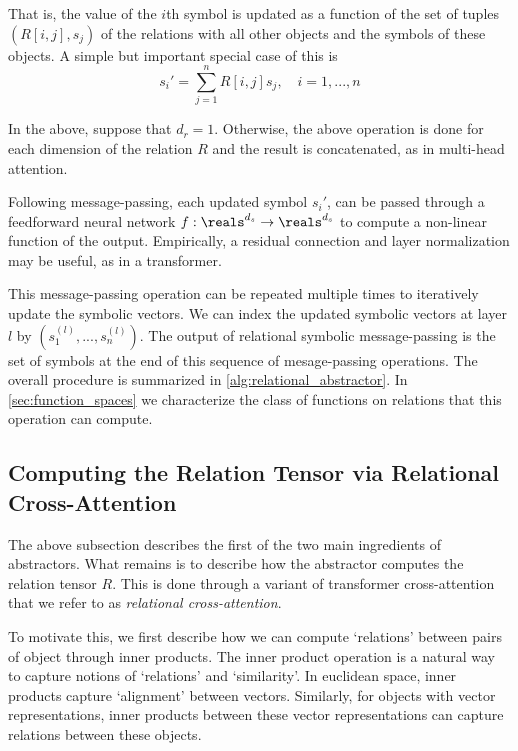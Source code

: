 That is, the value of the $i$th symbol is updated as a function of the set of tuples $(R[i,j], s_j)$ of the relations with all other objects and the symbols of these objects. A simple but important special case of this is
\begin{equation}
    \label{eq:linear_symbolic_mp}
    s_i' = \sum_{j=1}^{n} R[i,j] s_j, \quad i=1, ..., n
\end{equation}

In the above, suppose that $d_r = 1$. Otherwise, the above operation is done for each dimension of the relation $R$ and the result is concatenated, as in multi-head attention.

Following message-passing, each updated symbol $s_i'$, can be passed through a feedforward neural network $f:\reals^{d_s}\rightarrow \reals^{d_s}$ to compute a non-linear function of the output. Empirically, a residual connection and layer normalization may be useful, as in a transformer.

This message-passing operation can be repeated multiple times to iteratively update the symbolic vectors. We can index the updated symbolic vectors at layer $l$ by $(s_1^{(l)}, ..., s_n^{(l)})$. The output of relational symbolic message-passing is the set of symbols at the end of this sequence of mesage-passing operations. The overall procedure is summarized in \ref{alg:relational_abstractor}. In \ref{sec:function_spaces} we characterize the class of functions on relations that this operation can compute.

\subsection{Computing the Relation Tensor via Relational Cross-Attention}

The above subsection describes the first of the two main ingredients of abstractors. What remains is to describe how the abstractor computes the relation tensor $R$. This is done through a variant of transformer cross-attention that we refer to as \textit{relational cross-attention}.

To motivate this, we first describe how we can compute `relations' between pairs of object through inner products. The inner product operation is a natural way to capture notions of `relations' and `similarity'. In euclidean space, inner products capture `alignment' between vectors. Similarly, for objects with vector representations, inner products between these vector representations can capture relations between these objects.


